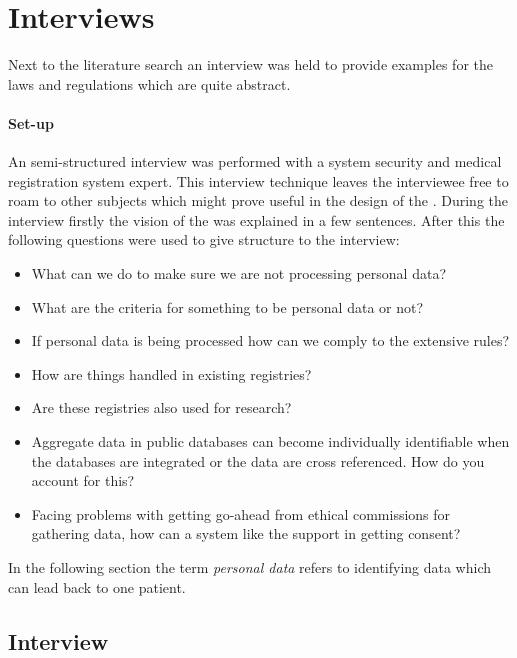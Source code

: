 \section{Interviews}
\label{security-interviews}

Next to the literature search an interview was held to provide examples for the laws and regulations which are quite abstract.

\paragraph{Set-up} 
\label{security-set-up}

An semi-structured interview was performed with a system security and medical registration system expert.
This interview technique leaves the interviewee free to roam to other subjects which might prove useful in the design of the \ivfsystem{}.
During the interview firstly the vision of the \ivfsystem{} was explained in a few sentences.
After this the following questions were used to give structure to the interview:

\begin{itemize}
	\item What can we do to make sure we are not processing personal data?
	\item What are the criteria for something to be personal data or not?
	\item If personal data is being processed how can we comply to the extensive rules?
	\item How are things handled in existing registries?
	\item Are these registries also used for research?
	\item Aggregate data in public databases can become individually identifiable when the databases are integrated or the data are cross referenced. 
	How do you account for this?
	\item Facing problems with getting go-ahead from ethical commissions for gathering data, how can a system like the \ivfsystem{} support in getting consent?
\end{itemize}

In the following section the term \emph{personal data} refers to identifying data which can lead back to one patient.

\subsection{Interview}
\label{security-first-interview}


